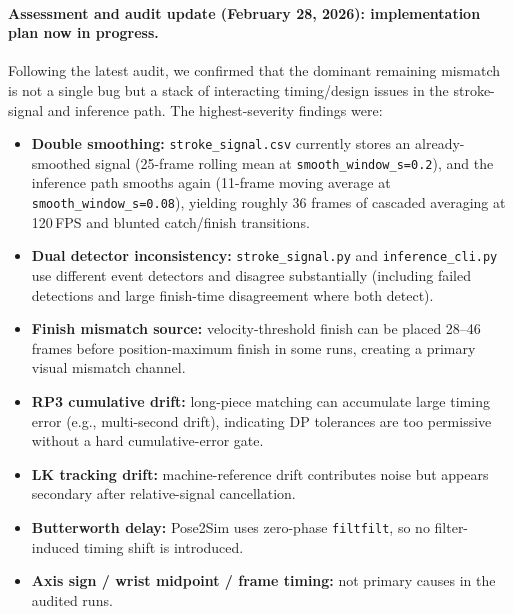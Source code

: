 \documentclass[11pt]{article}
\begin{document}
\paragraph{Assessment and audit update (February 28, 2026): implementation plan now in progress.}
Following the latest audit, we confirmed that the dominant remaining mismatch is not a single bug but a stack of interacting timing/design issues in the stroke-signal and inference path. The highest-severity findings were:
\begin{itemize}
	\item \textbf{Double smoothing:} \texttt{stroke\_signal.csv} currently stores an already-smoothed signal (25-frame rolling mean at \texttt{smooth\_window\_s=0.2}), and the inference path smooths again (11-frame moving average at \texttt{smooth\_window\_s=0.08}), yielding roughly 36 frames of cascaded averaging at 120\,FPS and blunted catch/finish transitions.
	\item \textbf{Dual detector inconsistency:} \texttt{stroke\_signal.py} and \texttt{inference\_cli.py} use different event detectors and disagree substantially (including failed detections and large finish-time disagreement where both detect).
	\item \textbf{Finish mismatch source:} velocity-threshold finish can be placed 28--46 frames before position-maximum finish in some runs, creating a primary visual mismatch channel.
	\item \textbf{RP3 cumulative drift:} long-piece matching can accumulate large timing error (e.g., multi-second drift), indicating DP tolerances are too permissive without a hard cumulative-error gate.
	\item \textbf{LK tracking drift:} machine-reference drift contributes noise but appears secondary after relative-signal cancellation.
	\item \textbf{Butterworth delay:} Pose2Sim uses zero-phase \texttt{filtfilt}, so no filter-induced timing shift is introduced.
	\item \textbf{Axis sign / wrist midpoint / frame timing:} not primary causes in the audited runs.
\end{itemize}
\end{document}
